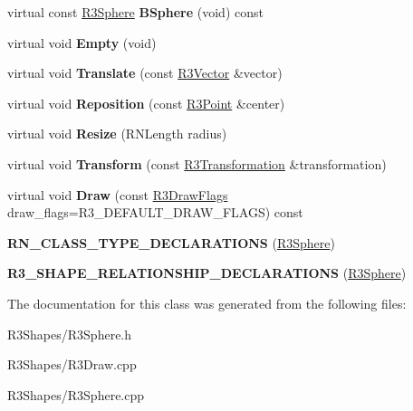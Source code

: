 \begin{DoxyCompactItemize}
\item 
virtual const \hyperlink{class_r3_sphere}{R3\+Sphere} {\bfseries B\+Sphere} (void) const \hypertarget{class_r3_sphere_a97a92f1b36e6e0f9addca653d298c17f}{}\label{class_r3_sphere_a97a92f1b36e6e0f9addca653d298c17f}

\item 
virtual void {\bfseries Empty} (void)\hypertarget{class_r3_sphere_a55d84ffe26354fb412267d5290056b74}{}\label{class_r3_sphere_a55d84ffe26354fb412267d5290056b74}

\item 
virtual void {\bfseries Translate} (const \hyperlink{class_r3_vector}{R3\+Vector} \&vector)\hypertarget{class_r3_sphere_adb3e1980a65678bf9a1ea38452e56996}{}\label{class_r3_sphere_adb3e1980a65678bf9a1ea38452e56996}

\item 
virtual void {\bfseries Reposition} (const \hyperlink{class_r3_point}{R3\+Point} \&center)\hypertarget{class_r3_sphere_acdf84916c39e97cc88f3f29f3dc52c82}{}\label{class_r3_sphere_acdf84916c39e97cc88f3f29f3dc52c82}

\item 
virtual void {\bfseries Resize} (R\+N\+Length radius)\hypertarget{class_r3_sphere_a71402fa79698dce9b752bbbd69c8a2f6}{}\label{class_r3_sphere_a71402fa79698dce9b752bbbd69c8a2f6}

\item 
virtual void {\bfseries Transform} (const \hyperlink{class_r3_transformation}{R3\+Transformation} \&transformation)\hypertarget{class_r3_sphere_ae02687a899eb193db0b5248d0685fbf0}{}\label{class_r3_sphere_ae02687a899eb193db0b5248d0685fbf0}

\item 
virtual void {\bfseries Draw} (const \hyperlink{class_r_n_flags}{R3\+Draw\+Flags} draw\+\_\+flags=R3\+\_\+\+D\+E\+F\+A\+U\+L\+T\+\_\+\+D\+R\+A\+W\+\_\+\+F\+L\+A\+GS) const \hypertarget{class_r3_sphere_a5248547a73378021e3c8e6c1b28f9220}{}\label{class_r3_sphere_a5248547a73378021e3c8e6c1b28f9220}

\item 
{\bfseries R\+N\+\_\+\+C\+L\+A\+S\+S\+\_\+\+T\+Y\+P\+E\+\_\+\+D\+E\+C\+L\+A\+R\+A\+T\+I\+O\+NS} (\hyperlink{class_r3_sphere}{R3\+Sphere})\hypertarget{class_r3_sphere_af14b91c5a902f15ac9a352ac5367b7a1}{}\label{class_r3_sphere_af14b91c5a902f15ac9a352ac5367b7a1}

\item 
{\bfseries R3\+\_\+\+S\+H\+A\+P\+E\+\_\+\+R\+E\+L\+A\+T\+I\+O\+N\+S\+H\+I\+P\+\_\+\+D\+E\+C\+L\+A\+R\+A\+T\+I\+O\+NS} (\hyperlink{class_r3_sphere}{R3\+Sphere})\hypertarget{class_r3_sphere_a14cadaaebbe4fb28a83b9a958cbf94e3}{}\label{class_r3_sphere_a14cadaaebbe4fb28a83b9a958cbf94e3}

\end{DoxyCompactItemize}


The documentation for this class was generated from the following files\+:\begin{DoxyCompactItemize}
\item 
R3\+Shapes/R3\+Sphere.\+h\item 
R3\+Shapes/R3\+Draw.\+cpp\item 
R3\+Shapes/R3\+Sphere.\+cpp\end{DoxyCompactItemize}
